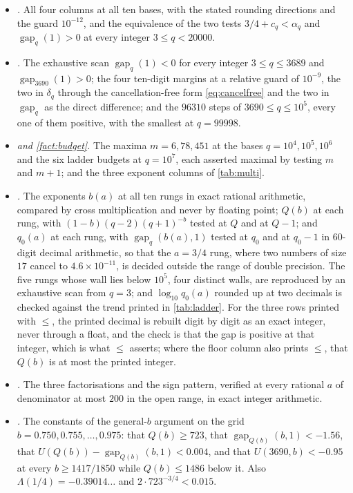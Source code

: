 \documentclass[11pt]{amsart}
\theoremstyle{definition}
\theoremstyle{remark}
\begin{document}
\begin{itemize}
  \item \emph{.} All four columns at all ten bases, with the stated rounding directions and the guard $10^{-12}$, and the equivalence of the two tests $3/4 + c_q < \alpha_q$ and $\operatorname{gap}_q(1) > 0$ at every integer $3 \le q < 20000$.
  \item \emph{.} The exhaustive scan $\operatorname{gap}_q(1) < 0$ for every integer $3 \le q \le 3689$ and $\operatorname{gap}_{3690}(1) > 0$; the four ten-digit margins at a relative guard of $10^{-9}$, the two in $\delta_q$ through the cancellation-free form \eqref{eq:cancelfree} and the two in $\operatorname{gap}_q$ as the direct difference; and the $96310$ steps of $3690 \le q \le 10^5$, every one of them positive, with the smallest at $q = 99998$.
  \item \emph{ and \cref{fact:budget}.} The maxima $m = 6, 78, 451$ at the bases $q = 10^4, 10^5, 10^6$ and the six ladder budgets at $q = 10^7$, each asserted maximal by testing $m$ and $m+1$; and the three exponent columns of \cref{tab:multi}.
  \item \emph{.} The exponents $b(a)$ at all ten rungs in exact rational arithmetic, compared by cross multiplication and never by floating point; $Q(b)$ at each rung, with $(1-b)(q-2)(q+1)^{-b}$ tested at $Q$ and at $Q-1$; and $q_0(a)$ at each rung, with $\operatorname{gap}_q(b(a),1)$ tested at $q_0$ and at $q_0 - 1$ in $60$-digit decimal arithmetic, so that the $a = 3/4$ rung, where two numbers of size $17$ cancel to $4.6 \times 10^{-11}$, is decided outside the range of double precision. The five rungs whose wall lies below $10^5$, four distinct walls, are reproduced by an exhaustive scan from $q = 3$; and $\log_{10} q_0(a)$ rounded up at two decimals is checked against the trend printed in \cref{tab:ladder}. For the three rows printed with $\le$, the printed decimal is rebuilt digit by digit as an exact integer, never through a float, and the check is that the gap is positive at that integer, which is what $\le$ asserts; where the floor column also prints $\le$, that $Q(b)$ is at most the printed integer.
  \item \emph{.} The three factorisations and the sign pattern, verified at every rational $a$ of denominator at most $200$ in the open range, in exact integer arithmetic.
  \item \emph{.} The constants of the general-$b$ argument on the grid $b = 0.750, 0.755, \dots, 0.975$: that $Q(b) \ge 723$, that $\operatorname{gap}_{Q(b)}(b,1) < -1.56$, that $U(Q(b)) - \operatorname{gap}_{Q(b)}(b,1) < 0.004$, and that $U(3690, b) < -0.95$ at every $b \ge 1417/1850$ while $Q(b) \le 1486$ below it. Also $\Lambda(1/4) = -0.39014\ldots$ and $2 \cdot 723^{-3/4} < 0.015$.

\end{itemize}
\end{document}
